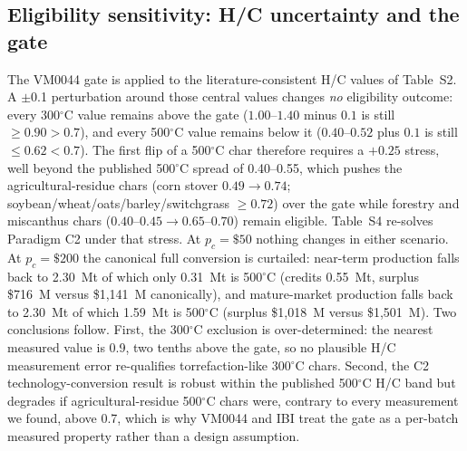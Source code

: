 \subsection{Eligibility sensitivity: H/C uncertainty and the gate}

The VM0044 gate is applied to the literature-consistent H/C values of
Table~S2. A $\pm$0.1 perturbation around those central values changes
\emph{no} eligibility outcome: every 300$^\circ$C value remains above the gate
($1.00$--$1.40$ minus $0.1$ is still $\ge0.90>0.7$), and every 500$^\circ$C
value remains below it ($0.40$--$0.52$ plus $0.1$ is still
$\le0.62<0.7$). The first flip of a 500$^\circ$C char therefore requires a
$+0.25$ stress, well beyond the published 500$^\circ$C spread of
0.40--0.55, which pushes the agricultural-residue chars (corn stover
$0.49\rightarrow0.74$; soybean/wheat/oats/barley/switchgrass
$\ge0.72$) over the gate while forestry and miscanthus chars
($0.40$--$0.45\rightarrow0.65$--$0.70$) remain eligible. Table~S4 re-solves
Paradigm C2 under that stress. At $p_c=\$50$ nothing changes in either
scenario. At $p_c=\$200$ the canonical full conversion is curtailed: near-term
production falls back to 2.30~Mt of which only 0.31~Mt is 500$^\circ$C
(credits 0.55~Mt, surplus \$716~M versus \$1{,}141~M canonically), and
mature-market production falls back to 2.30~Mt of which 1.59~Mt is
500$^\circ$C (surplus \$1{,}018~M versus \$1{,}501~M). Two conclusions follow.
First, the 300$^\circ$C exclusion is over-determined: the nearest measured
value is 0.9, two tenths above the gate, so no plausible H/C measurement error
re-qualifies torrefaction-like 300$^\circ$C chars. Second, the C2
technology-conversion result is robust within the published 500$^\circ$C H/C
band but degrades if agricultural-residue 500$^\circ$C chars were, contrary to
every measurement we found, above 0.7, which is why VM0044 and IBI treat the
gate as a per-batch measured property rather than a design assumption.

